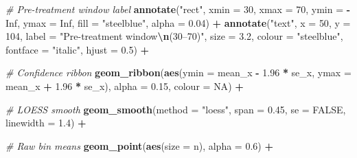 \documentclass[
]{article}
\newenvironment{Shaded}{\begin{snugshade}}{\end{snugshade}}
\newcommand{\AttributeTok}[1]{\textcolor[rgb]{0.13,0.29,0.53}{#1}}
\newcommand{\CommentTok}[1]{\textcolor[rgb]{0.56,0.35,0.01}{\textit{#1}}}
\newcommand{\ConstantTok}[1]{\textcolor[rgb]{0.56,0.35,0.01}{#1}}
\newcommand{\DecValTok}[1]{\textcolor[rgb]{0.00,0.00,0.81}{#1}}
\newcommand{\FloatTok}[1]{\textcolor[rgb]{0.00,0.00,0.81}{#1}}
\newcommand{\FunctionTok}[1]{\textcolor[rgb]{0.13,0.29,0.53}{\textbf{#1}}}
\newcommand{\NormalTok}[1]{#1}
\newcommand{\SpecialCharTok}[1]{\textcolor[rgb]{0.81,0.36,0.00}{\textbf{#1}}}
\newcommand{\StringTok}[1]{\textcolor[rgb]{0.31,0.60,0.02}{#1}}
\begin{document}
\begin{Shaded}
\begin{Highlighting}[]
  \CommentTok{\# Pre{-}treatment window label}
  \FunctionTok{annotate}\NormalTok{(}\StringTok{"rect"}\NormalTok{, }\AttributeTok{xmin =} \DecValTok{30}\NormalTok{, }\AttributeTok{xmax =} \DecValTok{70}\NormalTok{,}
           \AttributeTok{ymin =} \SpecialCharTok{{-}}\ConstantTok{Inf}\NormalTok{, }\AttributeTok{ymax =} \ConstantTok{Inf}\NormalTok{,}
           \AttributeTok{fill =} \StringTok{"steelblue"}\NormalTok{, }\AttributeTok{alpha =} \FloatTok{0.04}\NormalTok{) }\SpecialCharTok{+}
  \FunctionTok{annotate}\NormalTok{(}\StringTok{"text"}\NormalTok{, }\AttributeTok{x =} \DecValTok{50}\NormalTok{, }\AttributeTok{y =} \DecValTok{104}\NormalTok{,}
           \AttributeTok{label =} \StringTok{"Pre{-}treatment window}\SpecialCharTok{\textbackslash{}n}\StringTok{(30–70\textquotesingle{})"}\NormalTok{,}
           \AttributeTok{size =} \FloatTok{3.2}\NormalTok{, }\AttributeTok{colour =} \StringTok{"steelblue"}\NormalTok{,}
           \AttributeTok{fontface =} \StringTok{"italic"}\NormalTok{, }\AttributeTok{hjust =} \FloatTok{0.5}\NormalTok{) }\SpecialCharTok{+}

  \CommentTok{\# Confidence ribbon}
  \FunctionTok{geom\_ribbon}\NormalTok{(}\FunctionTok{aes}\NormalTok{(}\AttributeTok{ymin =}\NormalTok{ mean\_x }\SpecialCharTok{{-}} \FloatTok{1.96} \SpecialCharTok{*}\NormalTok{ se\_x,}
                  \AttributeTok{ymax =}\NormalTok{ mean\_x }\SpecialCharTok{+} \FloatTok{1.96} \SpecialCharTok{*}\NormalTok{ se\_x),}
              \AttributeTok{alpha =} \FloatTok{0.15}\NormalTok{, }\AttributeTok{colour =} \ConstantTok{NA}\NormalTok{) }\SpecialCharTok{+}

  \CommentTok{\# LOESS smooth}
  \FunctionTok{geom\_smooth}\NormalTok{(}\AttributeTok{method =} \StringTok{"loess"}\NormalTok{, }\AttributeTok{span =} \FloatTok{0.45}\NormalTok{,}
              \AttributeTok{se =} \ConstantTok{FALSE}\NormalTok{, }\AttributeTok{linewidth =} \FloatTok{1.4}\NormalTok{) }\SpecialCharTok{+}

  \CommentTok{\# Raw bin means}
  \FunctionTok{geom\_point}\NormalTok{(}\FunctionTok{aes}\NormalTok{(}\AttributeTok{size =}\NormalTok{ n), }\AttributeTok{alpha =} \FloatTok{0.6}\NormalTok{) }\SpecialCharTok{+}


\end{Highlighting}
\end{Shaded}
\end{document}
